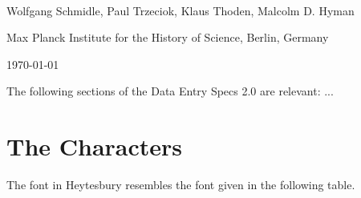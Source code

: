 \documentclass[fontsize=11pt, paper=a4, 
DIV15,
headings=normal,
parskip=half-, 
numbers=noenddot]{scrartcl}
\begin{document}
\begin{center}
{} \\[5mm]
\large Wolfgang Schmidle, Paul Trzeciok, Klaus Thoden, Malcolm D. Hyman

\normalsize Max Planck Institute for the History of Science, Berlin, Germany

\today
\end{center}


The following sections of the Data Entry Specs 2.0 are relevant: ...


\section{The Characters}

The font in Heytesbury resembles the font given in the following table.

\end{document}
